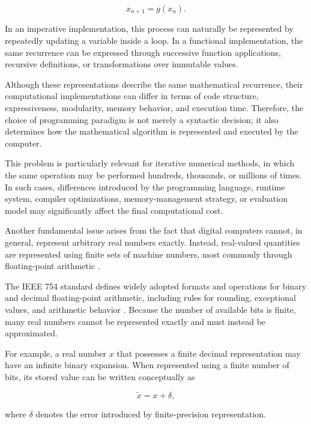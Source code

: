 \begin{equation}
    x_{n+1} = g(x_n).
\end{equation}

In an imperative implementation, this process can naturally be represented by
repeatedly updating a variable inside a loop. In a functional implementation,
the same recurrence can be expressed through successive function applications,
recursive definitions, or transformations over immutable values.

Although these representations describe the same mathematical recurrence,
their computational implementations can differ in terms of code structure,
expressiveness, modularity, memory behavior, and execution time. Therefore,
the choice of programming paradigm is not merely a syntactic decision; it
also determines how the mathematical algorithm is represented and executed by
the computer.

This problem is particularly relevant for iterative numerical methods, in
which the same operation may be performed hundreds, thousands, or millions of
times. In such cases, differences introduced by the programming language,
runtime system, compiler optimizations, memory-management strategy, or
evaluation model may significantly affect the final computational cost.

Another fundamental issue arises from the fact that digital computers cannot,
in general, represent arbitrary real numbers exactly. Instead, real-valued
quantities are represented using finite sets of machine numbers, most commonly
through floating-point arithmetic
\cite{higham2002accuracy,ieee7542019}.

The IEEE 754 standard defines widely adopted formats and operations for binary
and decimal floating-point arithmetic, including rules for rounding, exceptional
values, and arithmetic behavior \cite{ieee7542019}. Because the number of
available bits is finite, many real numbers cannot be represented exactly and
must instead be approximated.

For example, a real number $x$ that possesses a finite decimal representation
may have an infinite binary expansion. When represented using a finite number
of bits, its stored value can be written conceptually as

\begin{equation}
    \tilde{x} = x + \delta,
\end{equation}

where $\delta$ denotes the error introduced by finite-precision representation.

